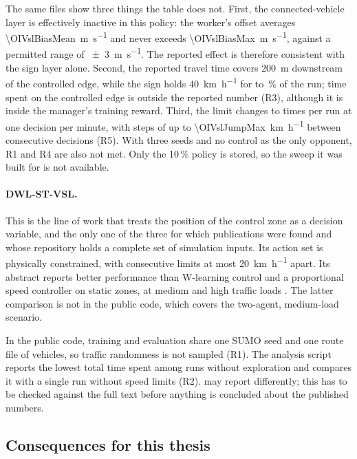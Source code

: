 The same files show three things the table does not. First, the connected-vehicle layer is effectively inactive in this policy: the worker's offset averages \SI{\OIVslBiasMean}{\metre\per\second} and never exceeds \SI{\OIVslBiasMax}{\metre\per\second}, against a permitted range of \SI{\pm 3}{\metre\per\second}. The reported effect is therefore consistent with the sign layer alone. Second, the reported travel time covers \SI{200}{\metre} downstream of the controlled edge, while the sign holds \SI{40}{\kilo\metre\per\hour} for \OIVslShareFortyMin{} to \OIVslShareFortyMax{}\,\% of the run; time spent on the controlled edge is outside the reported number (R3), although it is inside the manager's training reward. Third, the limit changes \OIVslChangesMin{} to \OIVslChangesMax{} times per run at one decision per minute, with steps of up to \SI{\OIVslJumpMax}{\kilo\metre\per\hour} between consecutive decisions (R5). With three seeds and no control as the only opponent, R1 and R4 are also not met. Only the 10\,\% policy is stored, so the sweep it was built for is not available.

\paragraph{DWL-ST-VSL.}
This is the line of work that treats the position of the control zone as a decision variable, and the only one of the three for which publications were found and whose repository holds a complete set of simulation inputs. Its action set is physically constrained, with consecutive limits at most \SI{20}{\kilo\metre\per\hour} apart. Its abstract reports better performance than W-learning control and a proportional speed controller on static zones, at medium and high traffic loads \parencite{Kusic2021Math}\verify{}. The latter comparison is not in the public code, which covers the two-agent, medium-load scenario.

In the public code, training and evaluation share one SUMO seed and one route file of \OIDwlVehicles{} vehicles, so traffic randomness is not sampled (R1). The analysis script reports the lowest total time spent among \OIDwlExploitRuns{} runs without exploration and compares it with a single run without speed limits (R2). \textcite{Kusic2021Math}\verify{} may report differently; this has to be checked against the full text before anything is concluded about the published numbers. 

\subsection{Consequences for this thesis}\label{sec:open-impl-consequences}

